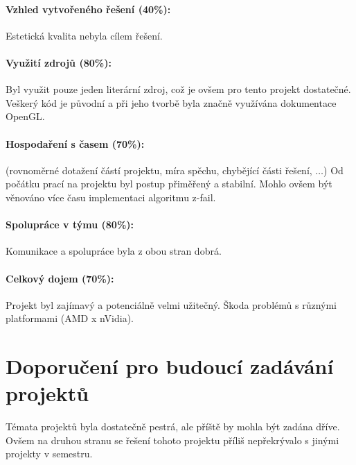 \documentclass[11pt,a4paper]{article}
\begin{document}
\paragraph{Vzhled vytvořeného řešení (40\%):} 
Estetická kvalita nebyla cílem řešení.

\paragraph{Využití zdrojů (80\%):} Byl využit pouze jeden literární zdroj, což je ovšem pro tento projekt dostatečné. Veškerý kód je původní a při jeho tvorbě byla značně využívána dokumentace OpenGL.

\paragraph{Hospodaření s časem (70\%):} (rovnoměrné dotažení částí projektu,
míra spěchu, chybějící části řešení, $\ldots$)
Od počátku prací na projektu byl postup přiměřený a stabilní. Mohlo ovšem být věnováno více času implementaci algoritmu z-fail.

\paragraph{Spolupráce v týmu (80\%):}
Komunikace a spolupráce byla z obou stran dobrá.

\paragraph{Celkový dojem (70\%):}
Projekt byl zajímavý a potenciálně velmi užitečný. Škoda problémů s různými platformami (AMD x nVidia).

\section{Doporučení pro budoucí zadávání projektů}

Témata projektů byla dostatečně pestrá, ale příště by mohla být zadána dříve. Ovšem na druhou stranu se řešení tohoto projektu příliš nepřekrývalo s jinými projekty v semestru.

\end{document}
